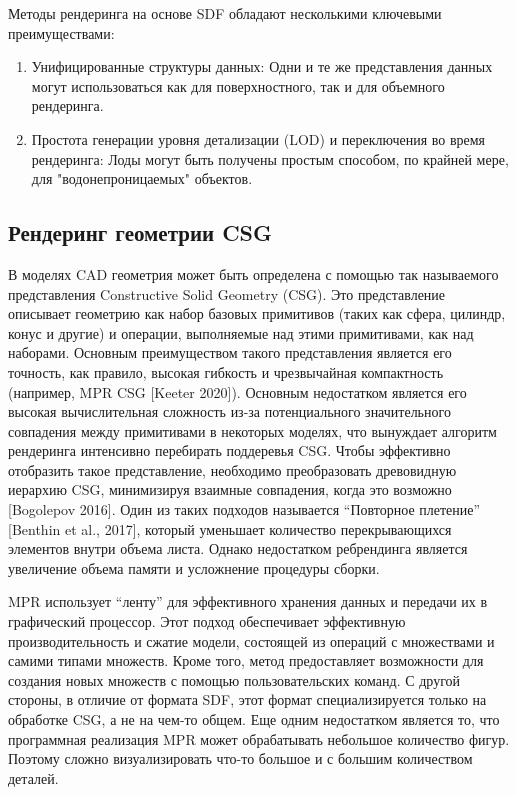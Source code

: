 \documentclass[a4paper,hidelinks,12pt]{article}
\begin{document}
Методы рендеринга на основе SDF обладают несколькими ключевыми преимуществами:
\begin{enumerate}
	\item Унифицированные структуры данных: Одни и те же представления данных могут использоваться как для поверхностного, так и для объемного рендеринга.
	\item Простота генерации уровня детализации (LOD) и переключения во время рендеринга: Лоды могут быть получены простым способом, по крайней мере, для "водонепроницаемых" объектов.
\end{enumerate}

\subsection{Рендеринг геометрии CSG}

В моделях CAD геометрия может быть определена с помощью так называемого представления Constructive Solid Geometry (CSG). 
Это представление описывает геометрию как набор базовых примитивов (таких как сфера, цилиндр, конус и другие) и 
операции, выполняемые над этими примитивами, как над наборами. Основным преимуществом такого представления является 
его точность, как правило, высокая гибкость и чрезвычайная компактность (например, MPR CSG [Keeter 2020]). 
Основным недостатком является его высокая вычислительная сложность из-за потенциального значительного совпадения между 
примитивами в некоторых моделях, что вынуждает алгоритм рендеринга интенсивно перебирать поддеревья CSG. Чтобы эффективно 
отобразить такое представление, необходимо преобразовать древовидную иерархию CSG, минимизируя взаимные совпадения, когда это возможно [Bogolepov 2016]. 
Один из таких подходов называется “Повторное плетение” [Benthin et al., 2017], который уменьшает количество перекрывающихся элементов 
внутри объема листа. Однако недостатком ребрендинга является увеличение объема памяти и усложнение процедуры сборки.

MPR использует “ленту” для эффективного хранения данных и передачи их в графический процессор. Этот подход 
обеспечивает эффективную производительность и сжатие модели, состоящей из операций с множествами и самими типами множеств. 
Кроме того, метод предоставляет возможности для создания новых множеств с помощью пользовательских команд. 
С другой стороны, в отличие от формата SDF, этот формат специализируется только на обработке CSG, 
а не на чем-то общем. Еще одним недостатком является то, что программная реализация MPR может обрабатывать небольшое количество фигур. 
Поэтому сложно визуализировать что-то большое и с большим количеством деталей.
\end{document}
